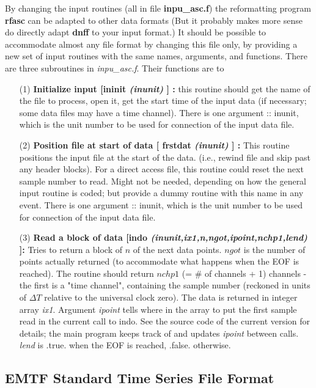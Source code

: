 By changing the input routines (all in file {\bf inpu\_asc.f})
the reformatting program {\bf rfasc}
can be adapted to other data formats
(But it probably makes more sense do directly adapt
{\bf dnff} to your input format.)
It should be possible to accommodate almost any file format
by changing this file only,
by providing a new set of input routines with the same names,
arguments, and functions.
There are three subroutines in {\it inpu\_asc.f}.
Their functions are to
\begin{itemize}
\item[(1)]
{\bf Initialize input [ininit { \it (inunit)} ] :} this
routine should get the name of the file to process,
open it, get the start time of the input data (if necessary;
some data files may have a time channel).
There is one argument :: inunit, which is the unit number to
be used for connection of the input data file.
\item[(2)]
{\bf Position file at start of data [ frstdat {\it (inunit) } ] :}
This routine positions the input file at the start of the
data.  (i.e., rewind file and skip past any header blocks).
For a direct access file, this routine could reset the next
sample number to read.  Might not be needed, depending on how
the general input routine is coded; but provide a dummy routine
with this name in any event.
There is one argument :: inunit, which is the unit number to
be used for connection of the input data file.
\item[(3)]
{\bf Read a block of data 
[indo {\it (inunit,ix1,n,ngot,ipoint,nchp1,lend)} ]: }
Tries to return a block of $n$ of the next data points.
$ngot$ is the number of points actually returned
(to accommodate what happens when the EOF is reached).
The routine should return $nchp1$ (= \# of channels + 1)
channels - the first is a "time channel", containing the
sample number (reckoned in units of $\Delta T$
relative to the universal clock zero).
The data is returned in integer array {\it  ix1}.
Argument {\it ipoint} tells where in the array to put the first
sample read in the current call to indo.
See the source code of the current version for details;
the main program keeps track of and updates {\it ipoint} between calls.
{\it lend } is .true. when the EOF is reached, .false. otherwise.
\end{itemize}

\subsection{EMTF Standard Time Series File Format}

